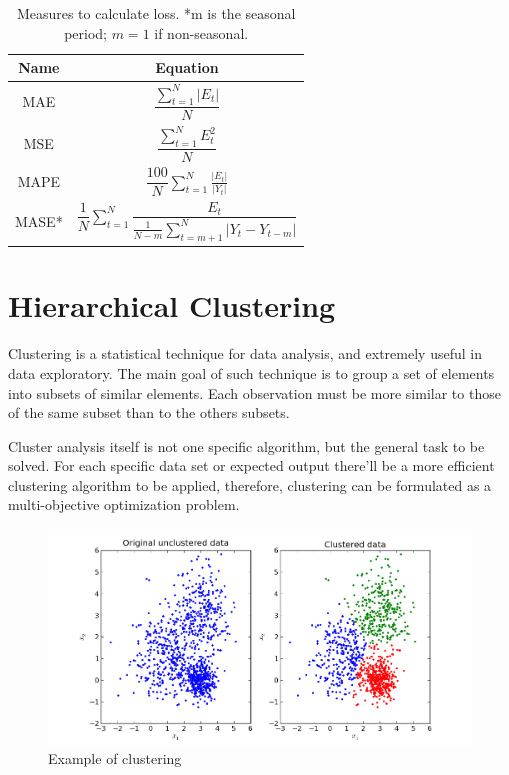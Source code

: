 \documentclass[12pt]{report}
\begin{document}
\begin{table}
\centering
\begin{tabular}{cc}
\toprule
\textbf{Name} & \textbf{Equation}\\
\midrule
MAE & $\dfrac{\sum_{t=1}^{N} |E_t|}{N}$ \\
\midrule
MSE & $\dfrac{\sum_{t=1}^{N} E_{t}^{2}}{N}$ \\
\midrule
MAPE & $\dfrac{100}{N} \sum_{t=1}^{N} \frac{|E_t|}{|Y_t|}$ \\
\midrule
MASE* & $\dfrac{1}{N} \sum_{t=1}^{N} \dfrac{E_t}{ \frac{1}{N-m} \sum_{t=m+1}^{N} |Y_t-Y_{t-m}|} $\\
\bottomrule
\end{tabular}
\caption{Measures to calculate loss. *m is the seasonal period; $m=1$ if non-seasonal.}
\label{tab:measures}
\end{table}

\section{Hierarchical Clustering}

Clustering is a statistical technique for data analysis, and extremely useful in data exploratory. The main goal of such technique is to group a set of elements into subsets of similar elements. Each observation must be more similar to those of the same subset than to the others subsets.

Cluster analysis itself is not one specific algorithm, but the general task to be solved. For each specific data set or expected output there'll be a more efficient clustering algorithm to be applied, therefore, clustering can be formulated as a multi-objective optimization problem. 

\begin{figure}
\centering
\includegraphics[width=\textwidth]{cluster.png}
\caption{Example of clustering}
\label{fig:ex_clus}
\end{figure}
\end{document}
